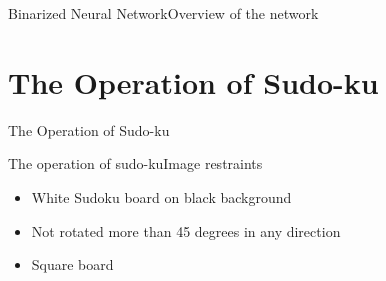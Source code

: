 \documentclass[10pt]{beamer}
\begin{document}
\begin{frame}{Binarized Neural Network}{Overview of the network}
\end{frame}

\section{The Operation of Sudo-ku}

\begin{frame}{The Operation of Sudo-ku}
\end{frame}


\begin{frame}{The operation of sudo-ku}{Image restraints}
\begin{itemize}
\item White Sudoku board on black background
\item Not rotated more than 45 degrees in any direction
\item Square board
\end{itemize}
\end{frame}
\end{document}
